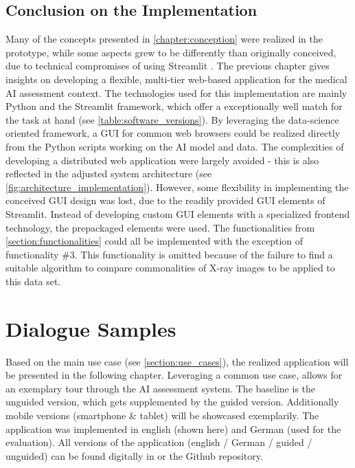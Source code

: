\documentclass[11pt,a4paper,english]{scrreprt}
\begin{document}
\section{Conclusion on the Implementation}
Many of the concepts presented in \autoref{chapter:conception} were realized in the prototype, while some aspects grew to be differently than originally conceived, due to technical compromises of using Streamlit \parencite{streamlit_website}. The previous chapter gives insights on developing a flexible, multi-tier web-based application for the medical AI assessment context. The technologies used for this implementation are mainly Python and the Streamlit framework, which offer a exceptionally well match for the task at hand (see \autoref{table:software_versions}). By leveraging the data-science oriented framework, a GUI for common web browsers could be realized directly from the Python scripts working on the AI model and data. The complexities of developing a distributed web application were largely avoided - this is also reflected in the adjusted system architecture (see \autoref{fig:architecture_implementation}). However, some flexibility in implementing the conceived GUI design was lost, due to the readily provided GUI elements of Streamlit. Instead of developing custom GUI elements with a specialized frontend technology, the prepackaged elements were used. The functionalities from \autoref{section:functionalities} could all be implemented with the exception of functionality \#3. This functionality is omitted because of the failure to find a suitable algorithm to compare commonalities of X-ray images to be applied to this data set.

\newpage
\chapter{Dialogue Samples}\label{chapter:dialogue_samples}
Based on the main use case (see \autoref{section:use_cases}), the realized application will be presented in the following chapter. Leveraging a common use case, allows for an exemplary tour through the AI assessment system. The baseline is the unguided version, which gets supplemented by the guided version. Additionally mobile versions (smartphone \& tablet) will be showcased exemplarily. The application was implemented in english (shown here) and German (used for the evaluation). All versions of the application (english / German / guided / unguided) can be found digitally in  or the Github repository.
\end{document}
